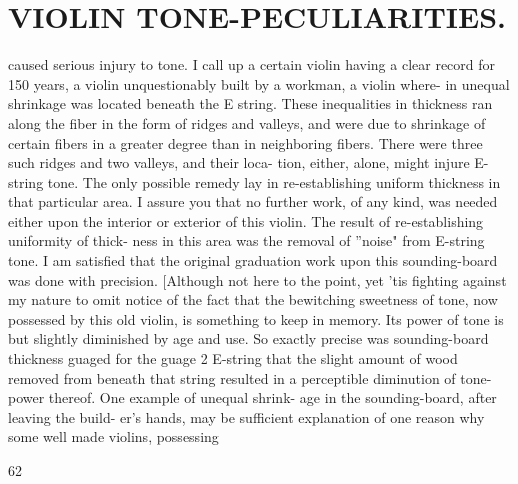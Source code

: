 \documentclass{article}
\begin{document}
\section*{VIOLIN TONE-PECULIARITIES.}
caused serious injury to tone. I call up a certain violin having a clear record for 150 years, a violin unquestionably built by a workman, a violin where- in unequal shrinkage was located beneath the E string. These inequalities in thickness ran along the fiber in the form of ridges and valleys, and were due to shrinkage of certain fibers in a greater degree than in neighboring fibers. There were three such ridges and two valleys, and their loca- tion, either, alone, might injure E-string tone. The only possible remedy lay in re-establishing uniform thickness in that particular area. I assure you that no further work, of any kind, was needed either upon the interior or exterior of this violin. The result of re-establishing uniformity of thick- ness in this area was the removal of ''noise" from E-string tone. I am satisfied that the original graduation work upon this sounding-board was done with precision. [Although not here to the point, yet 'tis fighting against my nature to omit notice of the fact that the bewitching sweetness of tone, now possessed by this old violin, is something to keep in memory. Its power of tone is but slightly diminished by age and use. So exactly precise was sounding-board thickness guaged for the guage 2 E-string that the slight amount of wood removed from beneath that string resulted in a perceptible diminution of tone- power thereof. One example of unequal shrink- age in the sounding-board, after leaving the build- er's hands, may be sufficient explanation of one reason why some well made violins, possessing

62
\end{document}
